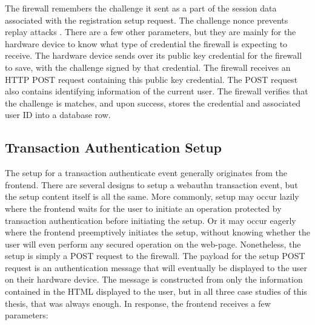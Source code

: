 \iffalse
\begin{lstlisting}
type PublicKeyCredentialCreationOptions struct {
	Challenge              Challenge                
	RelyingParty           RelyingPartyEntity       
	User                   UserEntity               
	Parameters             []CredentialParameter
	AuthenticatorSelection AuthenticatorSelection
	Timeout                int                      
	Attestation            ConveyancePreference
}
\end{lstlisting}
\fi

The firewall remembers the challenge it sent as a part of the session data associated with the registration setup request. The challenge nonce prevents replay attacks \cite{TODO-replay-attack}. There are a few other parameters, but they are mainly for the hardware device to know what type of credential the firewall is expecting to receive. The hardware device sends over its public key credential for the firewall to save, with the challenge signed by that credential. The firewall receives an HTTP POST request containing this public key credential. The POST request also contains identifying information of the current user. The firewall verifies that the challenge is matches, and upon success, stores the credential and associated user ID into a database row.

\subsection{Transaction Authentication Setup}


The setup for a transaction authenticate event generally originates from the frontend. There are several designs to setup a webauthn transaction event, but the setup content itself is all the same. More commonly, setup may occur lazily where the frontend waits for the user to initiate an operation protected by transaction authentication before initiating the setup. Or it may occur eagerly where the frontend preemptively initiates the setup, without knowing whether the user will even perform any secured operation on the web-page. Nonetheless, the setup is simply a POST request to the firewall. The payload for the setup POST request is an authentication message that will eventually be displayed to the user on their hardware device. The message is constructed from only the information contained in the HTML displayed to the user, but in all three case studies of this thesis, that was always enough. In response, the frontend receives a few parameters:

